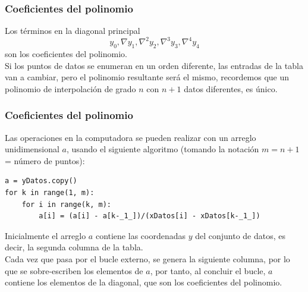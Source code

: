 \begin{frame}
\frametitle{Coeficientes del polinomio}
Los términos en la diagonal principal
\[ y_{0}, \nabla y_{1}, \nabla^{2} y_{2}, \nabla^{3} y_{3}, \nabla^{4} y_{4} \]
son los coeficientes del polinomio.
\\
\medskip
\pause
Si los puntos de datos se enumeran en un orden diferente, las entradas de la tabla van a cambiar, pero el polinomio resultante será el mismo, recordemos que un polinomio de interpolación de grado $n$ con $n + 1$ datos diferentes, es único.
\end{frame}
\begin{frame}[fragile]
\frametitle{Coeficientes del polinomio}
Las operaciones en la computadora se pueden realizar con un arreglo unidimensional $a$, usando el siguiente algoritmo (tomando la notación $m = n + 1$ = número de puntos):
\\
\medskip
\begin{lstlisting}[caption=Coeficiente del polinomio de Newton, style= FormattedNumber, basicstyle=\linespread{1.1}\ttfamily=\small, columns=fullflexible]
a = yDatos.copy()
for k in range(1, m):
    for i in range(k, m):
        a[i] = (a[i] - a[k-_1_])/(xDatos[i] - xDatos[k-_1_])
\end{lstlisting}
\end{frame}
\begin{frame}
Inicialmente el arreglo $a$ contiene las coordenadas $y$ del conjunto de datos, es decir, la segunda columna de la tabla.
\\
\medskip
\pause
Cada vez que pasa por el bucle externo, se genera la siguiente columna, por lo que se sobre-escriben los elementos de $a$, por tanto, al concluir el bucle, $a$ contiene los elementos de la diagonal, que son los coeficientes del polinomio.
\end{frame}

